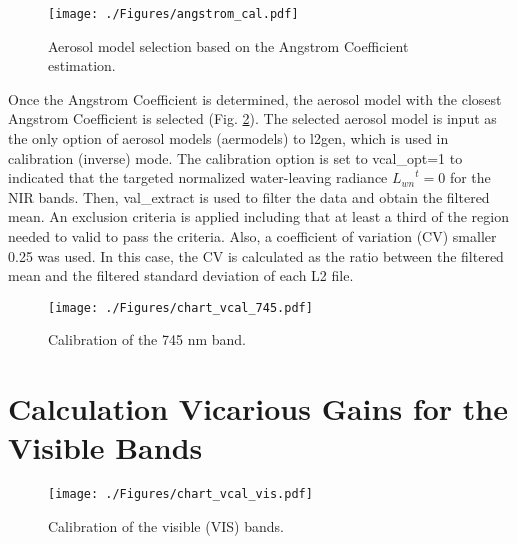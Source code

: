 \documentclass[10pt]{article}
\begin{document}
\begin{figure}[H]
  \centering
  \texttt{[image: ./Figures/angstrom\_cal.pdf]}
    \caption{Aerosol model selection based on the Angstrom Coefficient estimation.  \label{fig:angstrom_cal}} 
\end{figure}
Once the Angstrom Coefficient is determined, the aerosol model with the closest Angstrom Coefficient is selected (Fig. \ref{fig:chart_vcal_745}). 
The selected aerosol model is input as the only option of aerosol models ({\ttfamily aermodels}) to l2gen, which is used in calibration (inverse) mode. 
The calibration option is set to {\ttfamily vcal\_opt}=1 to indicated that the targeted normalized water-leaving radiance ${L_{wn}}^t = 0$ for the NIR bands. 
Then, {\ttfamily val\_extract} is used to filter the data and obtain the filtered mean. An exclusion criteria is applied including that at least a third of the region needed to valid to pass the criteria. 
Also, a coefficient of variation (CV) smaller 0.25 was used. 
In this case, the CV is calculated as the ratio between the filtered mean and the filtered standard deviation of each L2 file.
\begin{figure}[H]
  \centering
  \texttt{[image: ./Figures/chart\_vcal\_745.pdf]}
    \caption{Calibration of the 745 nm band.  \label{fig:chart_vcal_745}} 
\end{figure}
\section{Calculation Vicarious Gains for the Visible Bands}\label{sec:appendix_b}
\begin{figure}[H]
  \centering
  \texttt{[image: ./Figures/chart\_vcal\_vis.pdf]}
    \caption{Calibration of the visible (VIS) bands.  \label{fig:chart_vcal_vis}} 
\end{figure}
\end{document}
